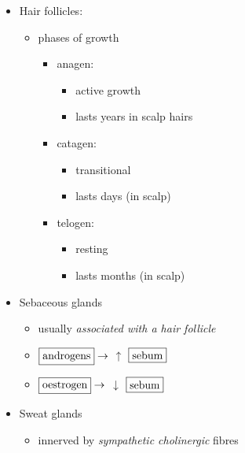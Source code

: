 \documentclass[
  12pt,
]{memoir}
\providecommand{\tightlist}{%
  \setlength{\itemsep}{0pt}\setlength{\parskip}{0pt}}
\begin{document}
\begin{itemize}
\tightlist
\item
  Hair follicles:

  \begin{itemize}
  \tightlist
  \item
    phases of growth

    \begin{itemize}
    \tightlist
    \item
      anagen:

      \begin{itemize}
      \tightlist
      \item
        active growth
      \item
        lasts years in scalp hairs
      \end{itemize}
    \item
      catagen:

      \begin{itemize}
      \tightlist
      \item
        transitional
      \item
        lasts days (in scalp)
      \end{itemize}
    \item
      telogen:

      \begin{itemize}
      \tightlist
      \item
        resting
      \item
        lasts months (in scalp)
      \end{itemize}
    \end{itemize}
  \end{itemize}
\item
  Sebaceous glands

  \begin{itemize}
  \tightlist
  \item
    usually \emph{associated with a hair follicle}
  \item
    \(\fbox{androgens}\rightarrow\) \textbf{\(\uparrow\)}
    \(\fbox{sebum}\)
  \item
    \(\fbox{oestrogen}\rightarrow\) \textbf{\(\downarrow\)}
    \(\fbox{sebum}\)
  \end{itemize}
\item
  Sweat glands

  \begin{itemize}
  \tightlist
  \item
    innerved by \emph{sympathetic cholinergic} fibres
  \end{itemize}
\end{itemize}
\end{document}
